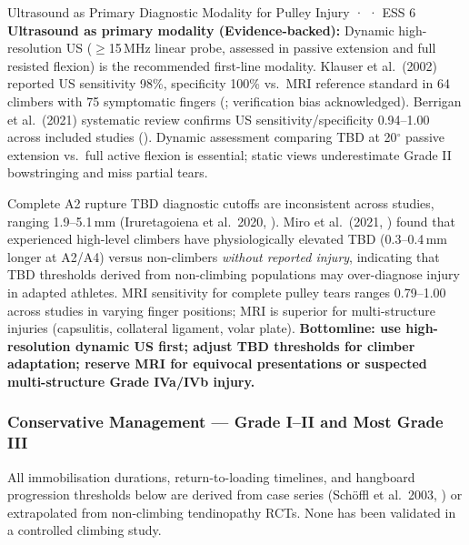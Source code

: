 \begin{evidencebox}{Ultrasound as Primary Diagnostic Modality for Pulley Injury · \evidencebacked · ESS 6}
\textbf{Ultrasound as primary modality (Evidence-backed):} Dynamic high-resolution US ($\geq$15\,MHz linear probe, assessed in passive extension and full resisted flexion) is the recommended first-line modality. Klauser et al.\ (2002) reported US sensitivity 98\%, specificity 100\% vs.\ MRI reference standard in 64 climbers with 75 symptomatic fingers (\cite{KFB+02}; verification bias acknowledged). Berrigan et al.\ (2021) systematic review confirms US sensitivity/specificity 0.94--1.00 across included studies (\cite{BWC+21}). Dynamic assessment comparing TBD at 20$^\circ$ passive extension vs.\ full active flexion is essential; static views underestimate Grade II bowstringing and miss partial tears.

Complete A2 rupture TBD diagnostic cutoffs are inconsistent across studies, ranging 1.9--5.1\,mm (Iruretagoiena et al.\ 2020, \cite{IUDORL+20}). Miro et al.\ (2021, \cite{MVSS21}) found that experienced high-level climbers have physiologically elevated TBD (0.3--0.4\,mm longer at A2/A4) versus non-climbers \textit{without reported injury}, indicating that TBD thresholds derived from non-climbing populations may over-diagnose injury in adapted athletes. MRI sensitivity for complete pulley tears ranges 0.79--1.00 across studies in varying finger positions; MRI is superior for multi-structure injuries (capsulitis, collateral ligament, volar plate). \textbf{Bottomline: use high-resolution dynamic US first; adjust TBD thresholds for climber adaptation; reserve MRI for equivocal presentations or suspected multi-structure Grade IVa/IVb injury.}
\end{evidencebox}

\subsubsection{Conservative Management --- Grade I--II and Most Grade III}

\begin{warningbox}[title=No Climbing Rehabilitation RCTs]
All immobilisation durations, return-to-loading timelines, and hangboard progression thresholds below are derived from case series (Sch\"{o}ffl et al.\ 2003, \cite{SHWS03}) or extrapolated from non-climbing tendinopathy RCTs. None has been validated in a controlled climbing study.
\end{warningbox}

